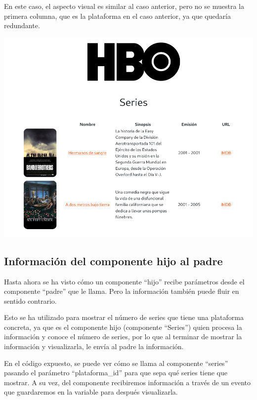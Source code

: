 \documentclass{\ClassPath/viu-tfm-template}
\begin{document}
\begin{itemize}
    En este caso, el aspecto visual es similar al caso anterior, pero no se muestra la primera columna, que es la plataforma en el caso anterior, ya que quedaría redundante.

    \vspace{-0.2em}
    \begin{center}
        \includegraphics[frame,width=0.7\linewidth]{img/series-3.png}
    \end{center}
\end{itemize}


\subsection{Información del componente hijo al padre}
Hasta ahora se ha visto cómo un componente “hijo” recibe parámetros desde el componente “padre” que le llama. Pero la información también puede fluir en sentido contrario.

Esto se ha utilizado para mostrar el número de series que tiene una plataforma concreta, ya que es el componente hijo (componente “Series”) quien procesa la información y conoce el número de series, por lo que al terminar de mostrar la información y visualizarla, le envía al padre la información.


En el código expuesto, se puede ver cómo se llama al componente “series” pasando el parámetro “plataforma\_id” para que sepa qué series tiene que mostrar. A su vez, del componente recibiremos información a través de un evento que guardaremos en la variable  para después visualizarla.
\end{document}
